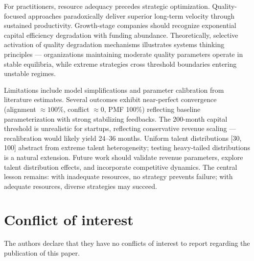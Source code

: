 \documentclass[alpha-refs]{wiley-article}
\begin{document}
For practitioners, resource adequacy precedes strategic optimization. Quality-focused approaches paradoxically deliver superior long-term velocity through sustained productivity. Growth-stage companies should recognize exponential capital efficiency degradation with funding abundance. Theoretically, selective activation of quality degradation mechanisms illustrates systems thinking principles --- organizations maintaining moderate quality parameters operate in stable equilibria, while extreme strategies cross threshold boundaries entering unstable regimes.

Limitations include model simplifications and parameter calibration from literature estimates. Several outcomes exhibit near-perfect convergence (alignment $\approx 100\%$, conflict $\approx 0$, PMF 100\%) reflecting baseline parameterization with strong stabilizing feedbacks. The 200-month capital threshold is unrealistic for startups, reflecting conservative revenue scaling --- recalibration would likely yield 24--36 months. Uniform talent distributions [30, 100] abstract from extreme talent heterogeneity; testing heavy-tailed distributions is a natural extension. Future work should validate revenue parameters, explore talent distribution effects, and incorporate competitive dynamics. The central lesson remains: with inadequate resources, no strategy prevents failure; with adequate resources, diverse strategies may succeed.



\section*{Conflict of interest}{\label{644442}}

The authors declare that they have no conflicts of interest to report regarding the publication of this paper.

\FloatBarrier

\end{document}
